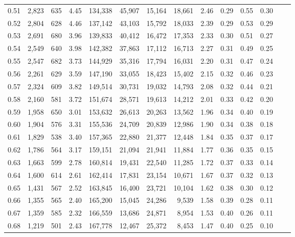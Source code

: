 \begin{tabular}{rrrrrrrrrrrrrr}
0.51 &  2,823 &  635 &    4.45 &  134,338 &   45,907 &  15,164 &  18,661 &  2.46 &  0.29 &  0.55 &      0.30 \\
0.52 &  2,804 &  628 &    4.46 &  137,142 &   43,103 &  15,792 &  18,033 &  2.39 &  0.29 &  0.53 &      0.29 \\
0.53 &  2,691 &  680 &    3.96 &  139,833 &   40,412 &  16,472 &  17,353 &  2.33 &  0.30 &  0.51 &      0.27 \\
0.54 &  2,549 &  640 &    3.98 &  142,382 &   37,863 &  17,112 &  16,713 &  2.27 &  0.31 &  0.49 &      0.25 \\
0.55 &  2,547 &  682 &    3.73 &  144,929 &   35,316 &  17,794 &  16,031 &  2.20 &  0.31 &  0.47 &      0.24 \\
0.56 &  2,261 &  629 &    3.59 &  147,190 &   33,055 &  18,423 &  15,402 &  2.15 &  0.32 &  0.46 &      0.23 \\
0.57 &  2,324 &  609 &    3.82 &  149,514 &   30,731 &  19,032 &  14,793 &  2.08 &  0.32 &  0.44 &      0.21 \\
0.58 &  2,160 &  581 &    3.72 &  151,674 &   28,571 &  19,613 &  14,212 &  2.01 &  0.33 &  0.42 &      0.20 \\
0.59 &  1,958 &  650 &    3.01 &  153,632 &   26,613 &  20,263 &  13,562 &  1.96 &  0.34 &  0.40 &      0.19 \\
0.60 &  1,904 &  576 &    3.31 &  155,536 &   24,709 &  20,839 &  12,986 &  1.90 &  0.34 &  0.38 &      0.18 \\
0.61 &  1,829 &  538 &    3.40 &  157,365 &   22,880 &  21,377 &  12,448 &  1.84 &  0.35 &  0.37 &      0.17 \\
0.62 &  1,786 &  564 &    3.17 &  159,151 &   21,094 &  21,941 &  11,884 &  1.77 &  0.36 &  0.35 &      0.15 \\
0.63 &  1,663 &  599 &    2.78 &  160,814 &   19,431 &  22,540 &  11,285 &  1.72 &  0.37 &  0.33 &      0.14 \\
0.64 &  1,600 &  614 &    2.61 &  162,414 &   17,831 &  23,154 &  10,671 &  1.67 &  0.37 &  0.32 &      0.13 \\
0.65 &  1,431 &  567 &    2.52 &  163,845 &   16,400 &  23,721 &  10,104 &  1.62 &  0.38 &  0.30 &      0.12 \\
0.66 &  1,355 &  565 &    2.40 &  165,200 &   15,045 &  24,286 &   9,539 &  1.58 &  0.39 &  0.28 &      0.11 \\
0.67 &  1,359 &  585 &    2.32 &  166,559 &   13,686 &  24,871 &   8,954 &  1.53 &  0.40 &  0.26 &      0.11 \\
0.68 &  1,219 &  501 &    2.43 &  167,778 &   12,467 &  25,372 &   8,453 &  1.47 &  0.40 &  0.25 &      0.10 \\

\end{tabular}
